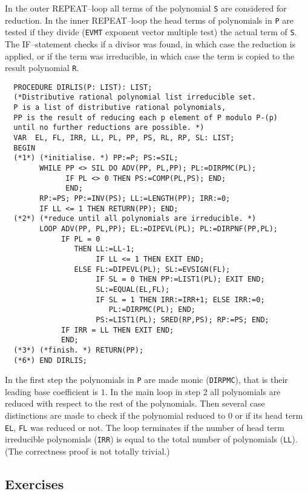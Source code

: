 In the outer REPEAT--loop all terms of the 
polynomial \verb/S/ are considered for reduction. 
In the inner REPEAT--loop the head terms of polynomials 
in \verb/P/ are tested if they divide 
(\verb/EVMT/ exponent vector multiple test)
the actual term of \verb/S/. 
The IF--statement checks if a divisor was found, 
in which case the reduction is applied, or if 
the term was irreducible, in which case the term is copied 
to the result polynomial \verb/R/.
  

{
\footnotesize
\begin{verbatim}
  PROCEDURE DIRLIS(P: LIST): LIST; 
  (*Distributive rational polynomial list irreducible set.
  P is a list of distributive rational polynomials,
  PP is the result of reducing each p element of P modulo P-(p)
  until no further reductions are possible. *)
  VAR  EL, FL, IRR, LL, PL, PP, PS, RL, RP, SL: LIST; 
  BEGIN
  (*1*) (*initialise. *) PP:=P; PS:=SIL; 
        WHILE PP <> SIL DO ADV(PP, PL,PP); PL:=DIRPMC(PL); 
              IF PL <> 0 THEN PS:=COMP(PL,PS); END; 
              END; 
        RP:=PS; PP:=INV(PS); LL:=LENGTH(PP); IRR:=0; 
        IF LL <= 1 THEN RETURN(PP); END; 
  (*2*) (*reduce until all polynomials are irreducible. *) 
        LOOP ADV(PP, PL,PP); EL:=DIPEVL(PL); PL:=DIRPNF(PP,PL); 
             IF PL = 0 
                THEN LL:=LL-1; 
                     IF LL <= 1 THEN EXIT END; 
                ELSE FL:=DIPEVL(PL); SL:=EVSIGN(FL); 
                     IF SL = 0 THEN PP:=LIST1(PL); EXIT END; 
                     SL:=EQUAL(EL,FL); 
                     IF SL = 1 THEN IRR:=IRR+1; ELSE IRR:=0; 
                        PL:=DIRPMC(PL); END; 
                     PS:=LIST1(PL); SRED(RP,PS); RP:=PS; END; 
             IF IRR = LL THEN EXIT END;
             END; 
  (*3*) (*finish. *) RETURN(PP); 
  (*6*) END DIRLIS; 
\end{verbatim}
}

In the first step the polynomials in \verb/P/ are made 
monic (\verb/DIRPMC/), that is their leading base coefficient  
is $1$. 
In the main loop in step 2 all polynomials 
are reduced with respect to the rest of the polynomials. 
Then several case distinctions are made to 
check if the polynomial reduced to $0$ or if its 
head term \verb/EL/, \verb/FL/ was reduced or not. 
The loop terminates if the number of 
head term irreducible polynomials (\verb/IRR/) is equal to the 
total number of polynomials (\verb/LL/).
(The correctness proof is not totally trivial.) 


\subsection{Exercises} %

